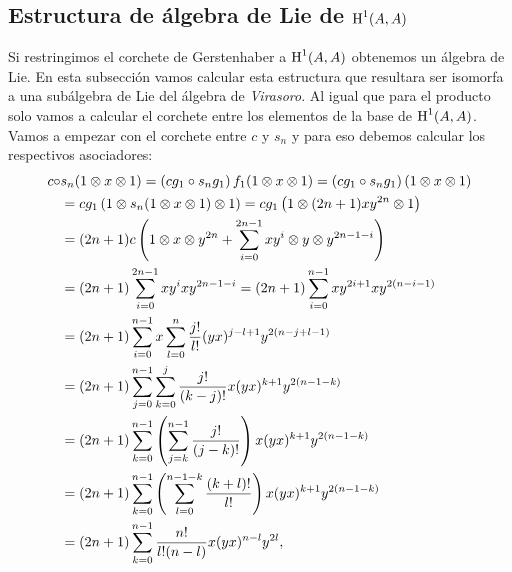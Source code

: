 \documentclass[fleqn,../tesis.tex]{subfiles}
\begin{document}
\subsection{Estructura de álgebra de Lie de $\operatorname{H}^{1}(A, A)$}
Si restringimos el corchete de Gerstenhaber a $\operatorname{H}^{1}(A, A)$ obtenemos un álgebra de Lie.
En esta subsección vamos calcular esta estructura que resultara ser isomorfa a una
subálgebra de Lie del álgebra de \emph{Virasoro}. Al igual que para el producto solo vamos a calcular
el corchete entre los elementos de la base de $\operatorname{H}^{1}(A, A)$. Vamos a empezar con el corchete
entre $c$ y $s_n$ y para eso debemos calcular los respectivos asociadores:
\begin{align*}
	c \circ & s_n(1 \otimes x \otimes 1) =  \left( cg_1 \circ s_n g_ 1\right)f_1(1 \otimes x \otimes 1)
		= \left( cg_1 \circ s_n g_ 1\right)(1 \otimes x \otimes 1)\\
	&= cg_1\left(1 \otimes s_n(1\otimes x \otimes 1) \otimes 1\right) = cg_1\left(1 \otimes (2n + 1)xy^{2n} \otimes 1\right)\\
	&= (2n+1)c\left(1 \otimes x \otimes y^{2n} + \sum_{i = 0}^{2n - 1}xy^i \otimes y \otimes y^{2n -1 -i}\right)\\
	&= (2n + 1)\sum_{i = 0}^{2n - 1}xy^i x y^{2n -1 -i}
		= (2n + 1)\sum_{i = 0}^{n - 1}xy^{2i + 1} x y^{2(n -i -1)}\\
	&=(2n + 1)\sum_{i = 0}^{n - 1}x\sum_{l = 0}^{n}\frac{j!}{l!}(yx)^{j - l + 1}y^{2(n - j + l - 1)}\\
	&=(2n +1)\sum_{j = 0}^{n - 1}\sum_{k = 0}^{j}\frac{j!}{(k - j)!}x(yx)^{k + 1}y^{2(n - 1 -k)}\\
	&=(2n + 1)\sum_{k = 0}^{n -1}
		\left(\sum_{j = k}^{n - 1}\frac{j!}{(j - k)!}\right)x(yx)^{k + 1}y^{2(n - 1 - k)}\\
	&=(2n + 1)\sum_{k = 0}^{n -1}
		\left(\sum_{l = 0}^{n - 1 - k}\frac{(k + l)!}{l!}\right)x(yx)^{k + 1}y^{2(n - 1 - k)}\\
	&=(2n + 1)\sum_{k = 0}^{n -1}\frac{n!}{l!(n - l)} x(yx)^{n - l}y^{2l},
\end{align*}
\end{document}
